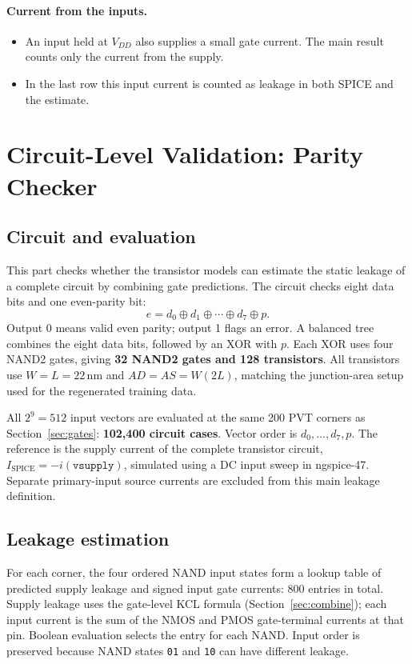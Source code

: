\documentclass[11pt]{article}
\begin{document}
\paragraph{Current from the inputs.}
\begin{itemize}
    \item An input held at $V_{DD}$ also supplies a small gate current. The
          main result counts only the current from the supply.
    \item In the last row this input current is counted as leakage in both
          SPICE and the estimate.
\end{itemize}

\section{Circuit-Level Validation: Parity Checker}
\label{sec:circuit}

\subsection{Circuit and evaluation}
This part checks whether the transistor models can estimate the static
leakage of a complete circuit by combining gate predictions. The circuit
checks eight data bits and one even-parity bit:
\begin{equation}
e=d_0\oplus d_1\oplus\cdots\oplus d_7\oplus p.
\end{equation}
Output 0 means valid even parity; output 1 flags an error. A balanced tree
combines the eight data bits, followed by an XOR with $p$. Each XOR uses
four NAND2 gates, giving \textbf{32 NAND2 gates and 128 transistors}.
All transistors use $W=L=22$\,nm and $AD=AS=W(2L)$, matching the
junction-area setup used for the regenerated training data.

All $2^9=512$ input vectors are evaluated at the same 200 PVT corners as
Section~\ref{sec:gates}: \textbf{102,400 circuit cases}. Vector order is
$d_0,\ldots,d_7,p$. The reference is the supply current of the complete
transistor circuit, $I_{\mathrm{SPICE}}=-i(\texttt{vsupply})$, simulated
using a DC input sweep in ngspice-47. Separate primary-input source currents
are excluded from this main leakage definition.

\subsection{Leakage estimation}
For each corner, the four ordered NAND input states form a lookup table
of predicted supply leakage and signed input gate currents: 800 entries
in total. Supply leakage uses the gate-level KCL formula
(Section~\ref{sec:combine}); each input current is the sum of the NMOS and
PMOS gate-terminal currents at that pin. Boolean evaluation selects the
entry for each NAND. Input order is preserved because NAND states
\texttt{01} and \texttt{10} can have different leakage.
\end{document}
